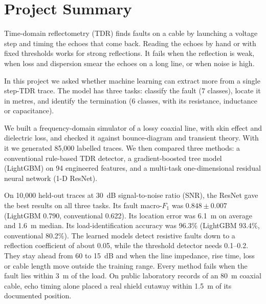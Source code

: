 \documentclass[11pt,a4paper]{article}
\begin{document}
\section*{Project Summary}
Time-domain reflectometry (TDR) finds faults on a cable by launching a voltage step and timing the echoes that come back. Reading the echoes by hand or with fixed thresholds works for strong reflections. It fails when the reflection is weak, when loss and dispersion smear the echoes on a long line, or when noise is high.

In this project we asked whether machine learning can extract more from a single step-TDR trace. The model has three tasks: classify the fault (7 classes), locate it in metres, and identify the termination (6 classes, with its resistance, inductance or capacitance).


We built a frequency-domain simulator of a lossy coaxial line, with skin effect and dielectric loss, and checked it against bounce-diagram and transient theory. With it we generated 85,000 labelled traces. We then compared three methods: a conventional rule-based TDR detector, a gradient-boosted tree model (LightGBM) on 94 engineered features, and a multi-task one-dimensional residual neural network (1-D ResNet).

On 10,000 held-out traces at 30~dB signal-to-noise ratio (SNR), the ResNet gave the best results on all three tasks. Its fault macro-$F_1$ was $0.848 \pm 0.007$ (LightGBM 0.790, conventional 0.622). Its location error was 6.1~m on average and 1.6~m median. Its load-identification accuracy was 96.3\% (LightGBM 93.4\%, conventional 80.2\%).
The learned models detect resistive faults down to a reflection coefficient of about 0.05, while the threshold detector needs 0.1--0.2. They stay ahead from 60 to 15~dB and when the line impedance, rise time, loss or cable length move outside the training range. Every method fails when the fault lies within 3~m of the load. On public laboratory records of an 80~m coaxial cable, echo timing alone placed a real shield cutaway within 1.5~m of its documented position.









\FloatBarrier
{}
{}
{\small


}
\end{document}
